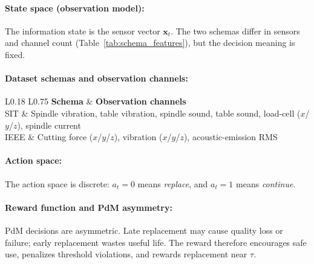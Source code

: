 \documentclass[sn-basic]{sn-jnl}%
\begin{document}
\paragraph{State space (observation model):}
The information state is the sensor vector $\mathbf{x}_t$. The two schemas differ in sensors and channel count (Table~\ref{tab:schema_features}), but the decision meaning is fixed.

\paragraph{Dataset schemas and observation channels:}
\begin{table}[htbp]
\centering
\caption{Sensor channels used as observations by the RL environment}
\label{tab:schema_features}
	\begin{tabular}{L{0.18\linewidth} L{0.75\linewidth}}
	\toprule
	\textbf{Schema} & \textbf{Observation channels}\\
	\midrule
	SIT & Spindle vibration, table vibration, spindle sound, table sound, load-cell ($x$/$y$/$z$), spindle current\\
	IEEE & Cutting force ($x$/$y$/$z$), vibration ($x$/$y$/$z$), acoustic-emission RMS\\
	\bottomrule
	\end{tabular}
\end{table}

\paragraph{Action space:}
The action space is discrete: $a_t=0$ means \emph{replace}, and $a_t=1$ means \emph{continue}.

\paragraph{Reward function and PdM asymmetry:}
PdM decisions are asymmetric. Late replacement may cause quality loss or failure; early replacement wastes useful life. The reward therefore encourages safe use, penalizes threshold violations, and rewards replacement near $\tau$.
\end{document}
